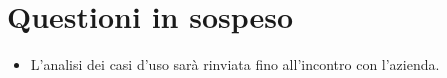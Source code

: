 \documentclass[../verbale-2016-12-14.tex]{subfiles}
\begin{document}
	\section{Questioni in sospeso} %
	\begin{itemize}
		\item L’analisi dei casi d’uso sarà rinviata fino all’incontro con l’azienda.
	\end{itemize}
\end{document}
